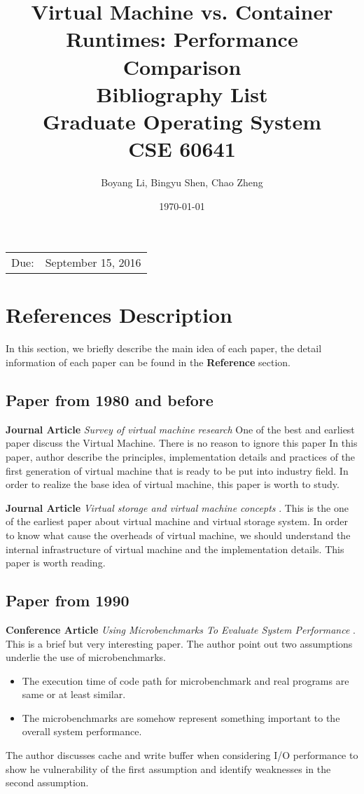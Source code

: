 \documentclass{article}
\title{{\textbf{Virtual Machine vs. Container Runtimes: Performance Comparison}} \\
       \vspace{3\baselineskip}
       {\large Bibliography List} \\
       \vspace{3\baselineskip}
       {\large Graduate Operating System} \\ 
       {\large CSE 60641} %
      }
\date{\today} %
\author{Boyang Li, Bingyu Shen, Chao Zheng}
\begin{document}
\maketitle %

\begin{center}
\begin{tabular}{l r}
Due:& September 15, 2016\\ 
\end{tabular}
\end{center}

\pagebreak

\section{References Description}

In this section, we briefly describe the main idea of each paper, the detail information of each
paper can be found in the \textbf{Reference} section.

\subsection{Paper from 1980 and before}

\textbf{Journal Article} \emph{Survey of virtual machine research}\cite{goldberg1974survey} One
of the best and earliest paper discuss the Virtual Machine. There is no reason to ignore this paper  
In this paper, author describe the principles, implementation details and practices of the first
generation of virtual machine that is ready to be put into industry field. In order to realize the
base idea of virtual machine, this paper is worth to study. 

\medskip

\textbf{Journal Article} \emph{Virtual storage and virtual machine concepts}
\cite{parmelee1972virtual}. This is the one of the earliest paper about virtual machine 
and virtual storage system. In order to know what cause the overheads of virtual machine, we should
understand the internal infrastructure of virtual machine and the implementation details. This paper 
is worth reading.

\subsection{Paper from 1990}

\textbf{Conference Article} \emph{Using Microbenchmarks To Evaluate System Performance}
\cite{bershad1992using}. This is a brief but very interesting paper. The author point out two 
assumptions underlie the use of microbenchmarks.
\begin{itemize}
    \item The execution time of code path for microbenchmark and real programs are same or at least 
        similar.
    \item The microbenchmarks are somehow represent something important to the overall 
        system performance.
\end{itemize}
The author discusses cache and write buffer when considering I/O performance to show he vulnerability
of the first assumption and identify weaknesses in the second assumption.
\end{document}

